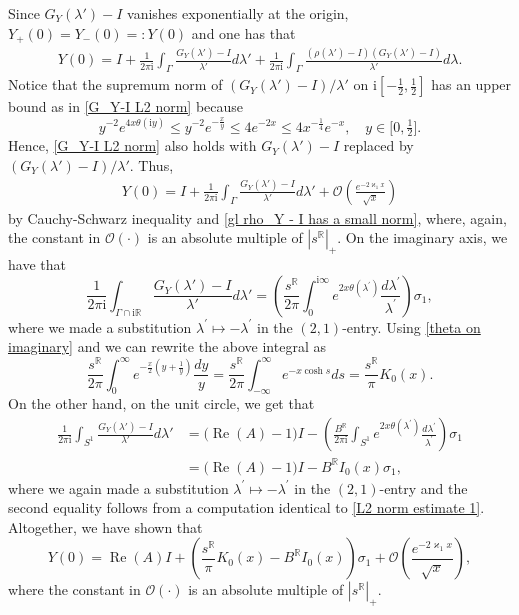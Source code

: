 \documentclass[a4paper,10pt,leqno]{amsart}
\numberwithin{equation}{subsection}
\theoremstyle{plain}
\theoremstyle{definition}
\theoremstyle{remark}
\theoremstyle{case}
\newcommand{\R}{\mathbb R}
\newcommand{\ii}{\mathrm{i}}
\renewcommand{\O}{\mathcal{O}}
\renewcommand{\Re}{\operatorname{Re}}
\begin{document}
Since \( G_{Y}(\lambda') - I \) vanishes exponentially at the origin, \( Y_+(0) = Y_-(0) =: Y(0)\) and one has that
\begin{align}
    Y(0) = I + \frac{1}{2\pi \ii} \int_\Gamma \frac{G_Y(\lambda') - I}{\lambda'} d\lambda'  + \frac{1}{2\pi \ii} \int_\Gamma \frac{(\rho(\lambda') - I)(G_Y(\lambda') - I)}{\lambda'} d\lambda.
\end{align}
Notice that the supremum norm of \( (G_Y(\lambda')-I)/\lambda'\) on \( \ii [-\tfrac12,\tfrac12]\) has an upper bound as in \eqref{G_Y-I L2 norm} because
\[
y^{-2}e^{4x\theta(\ii y)}\leq y^{-2}e^{-\frac xy} \leq 4e^{-2x} \leq 4x^{-\frac14}e^{-x}, \quad y\in\big[0,\tfrac12\big].
\]
Hence, \eqref{G_Y-I L2 norm} also holds with \( G_Y(\lambda')-I\) replaced by \( (G_Y(\lambda')-I)/\lambda'\). Thus,
\begin{align}
\label{representation Y(0)}
Y(0) = I + \frac{1}{2\pi \ii} \int_\Gamma \frac{G_Y(\lambda') - I}{\lambda'} d\lambda' +  \O\left( \frac{e^{-2\varkappa_1x}}{\sqrt x} \right)
\end{align}
by Cauchy-Schwarz inequality and \eqref{gl rho_Y - I has a small norm}, where, again, the constant in \( \O(\cdot) \) is an absolute multiple of \( |s^\R|_+ \). On the imaginary axis, we have that
\[
\frac{1}{2\pi \ii} \int_{\Gamma\cap\ii\R} \frac{G_Y(\lambda')-I}{\lambda'}d\lambda'  = \left( \frac{s^\R}{2\pi }\int_0^{\ii\infty} e^{2x\theta(\lambda^\prime)}\frac{d\lambda^\prime}{\lambda^\prime} \right) \sigma_1,
\]
where we made a substitution \( \lambda^\prime \mapsto -\lambda^\prime \) in the \((2,1)\)-entry. Using \eqref{theta on imaginary} and \cite[(10.32.9)]{NIST:DLMF} we can rewrite the above integral as
\begin{equation}
    \label{integral K0}
    \frac{s^\R}{2 \pi} \int_{0}^{\infty} e^{-\frac{x}{2}(y + \frac{1}{y})} \frac{dy}{y} = \frac{s^\R}{2\pi} \int_{-\infty}^\infty e^{-x\cosh s}ds = \frac{s^\R}\pi K_0(x).
\end{equation}
On the other hand, on the unit circle, we get that
\begin{align*}
\frac{1}{2\pi \ii} \int_{S^1} \frac{G_Y(\lambda')-I}{\lambda'}d\lambda'  & = \big(\Re(A)-1\big) I - \left(\frac{B^\R}{2\pi \ii} \int_{S^1} e^{2x\theta(\lambda^\prime)}\frac{d\lambda^\prime}{\lambda^\prime} \right) \sigma_1 \\
& = \big(\Re(A)-1\big) I - B^\R I_0(x)\sigma_1,
\end{align*}
where we again made a substitution \( \lambda^\prime \mapsto -\lambda^\prime \) in the \((2,1)\)-entry and the second equality follows from a computation identical to \eqref{L2 norm estimate 1}. Altogether, we have shown that
\begin{equation}
    Y(0) = \Re(A) I + \left( \frac{s^\R}\pi K_0(x) - B^\R I_0(x)\right)\sigma_1 + \O\left( \frac{e^{-2\varkappa_1x}}{\sqrt x} \right),
    \label{gl Y asymptotic eq 2}
\end{equation}
 where the constant in \( \O(\cdot) \) is an absolute multiple of \( |s^\R|_+ \). 
 
\end{document}
